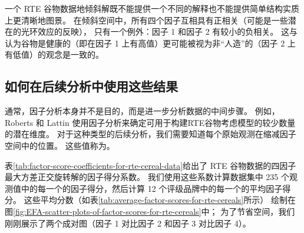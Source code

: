 一个 RTE 谷物数据地倾斜解既不能提供一个不同的解释也不能提供简单结构实质上更清晰地图景。
在倾斜空间中，所有四个因子互相具有正相关（可能是一些潜在的光环效应的反映），
只有一个例外：因子 1 和因子 2 有较小的负相关。
这与认为谷物是健康的（即在因子 1 上有高值）更可能被视为非“人造”的（因子 2 上有低值）的观念是一致的。


\subsection{如何在后续分析中使用这些结果}

通常，因子分析本身并不是目的，而是进一步分析数据的中间步骤。
例如，Roberts 和 Lattin 使用因子分析来确定可用于构建RTE谷物考虑模型的较少数量的潜在维度。
对于这种类型的后续分析，我们需要知道每个原始观测在缩减因子空间中的位置。
这些值称为。

表\ref{tab:factor-score-coefficients-for-rte-cereal-data}给出了 RTE 谷物数据的四因子最大方差正交旋转解的因子得分系数。
我们使用这些系数计算数据集中 235 个观测值中的每一个的因子得分，然后计算 12 个评级品牌中的每一个的平均因子得分。
这些平均分数（如表\ref{tab:average-factor-scores-for-rte-cereals}所示）
绘制在图\ref{fig:EFA-scatter-plots-of-factor-scores-for-rte-cereals}中；
为了节省空间，我们刚刚展示了两个成对图（因子 1 对比因子 2 和因子 3 对比因子 4）。

